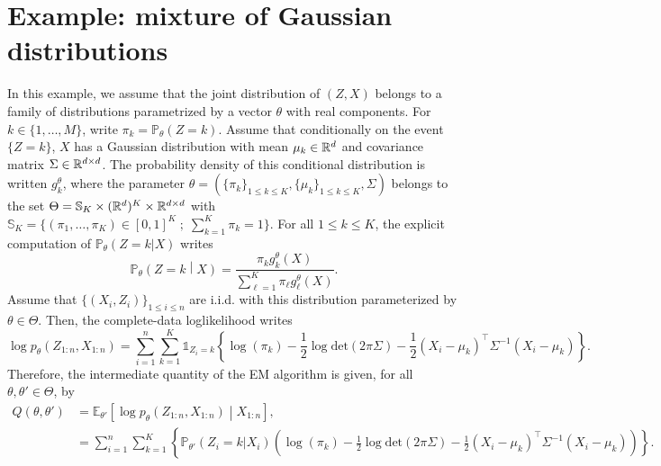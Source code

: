 \documentclass[english,graybox,envcountchap,envcountsame,sectrefs,shortlabels]{svmono}
\theoremstyle{style}
\newcommand{\eqsp}{}
\begin{document}
\section{Example: mixture of Gaussian distributions}
In this example, we assume that the joint distribution of $(Z,X)$ belongs to a family of distributions parametrized by a vector $\theta$ with real components. For $k\in\{1,\ldots,M\}$, write $\pi_k = \mathbb{P}_\theta(Z = k)$. Assume that conditionally on the event $\{Z = k\}$, $X$ has a Gaussian distribution with mean $\mu_k \in\mathbb{R}^d$ and covariance matrix $\Sigma\in \mathbb{R}^{d\times d}$. The probability density of this conditional distribution is written $g_k^\theta$, where the parameter $\theta=(\{\pi_k\}_{1\leq k \leq K}, \{\mu_k\}_{1\leq k \leq K}, \Sigma)$ belongs to the set $\Theta= \mathbb{S}_K \times (\mathbb{R}^d)^K  \times \mathbb{R}^{d \times d}$ with $\mathbb{S}_K = \{(\pi_1,\ldots,\pi_K)\in[0,1]^K\;;\; \sum_{k=1}^K \pi_k=1\}$. For all $1\leq k \leq K$, the explicit computation of $\mathbb{P}_\theta(Z=k | X)$ writes
$$
\mathbb{P}_\theta\left(Z=k\middle | X\right) = \frac{\pi_kg^{\theta}_k(X)}{\sum_{\ell=1}^{K}\pi_\ell g^{\theta}_\ell(X)}\eqsp. %
$$
Assume that $\{(X_i,Z_i)\}_{1\leq i\leq n}$ are i.i.d. with this distribution parameterized by $\theta\in\Theta$. Then, the complete-data loglikelihood writes
$$
\log p_\theta (Z_{1:n},X_{1:n}) = \sum_{i=1}^n \sum_{k=1}^K \mathds{1}_{Z_i = k}\left\{\log(\pi_k) -\frac{1}{2}\log \mathrm{det}(2\pi \Sigma) -\frac{1}{2}(X_i - \mu_{k})^\top \Sigma^{-1}(X_i - \mu_{k})  \right\}\eqsp.%
$$
Therefore, the intermediate quantity of the EM algorithm is given, for all $\theta,\theta' \in\Theta$, by
\begin{align*}
Q(\theta,\theta') &= \mathbb{E}_{\theta'} \left[\log p_\theta (Z_{1:n},X_{1:n}) \middle | X_{1:n}\right]\eqsp,\\
&= \sum_{i=1}^n \sum_{k=1}^K \left\{ \mathbb{P}_{\theta'}(Z_i = k|X_i)\left( \log(\pi_k) -\frac{1}{2}\log \mathrm{det}(2\pi \Sigma)  -\frac{1}{2}(X_i - \mu_{k})^\top \Sigma^{-1}(X_i - \mu_{k})\right) \right\} \eqsp.%
\end{align*}
\end{document}
